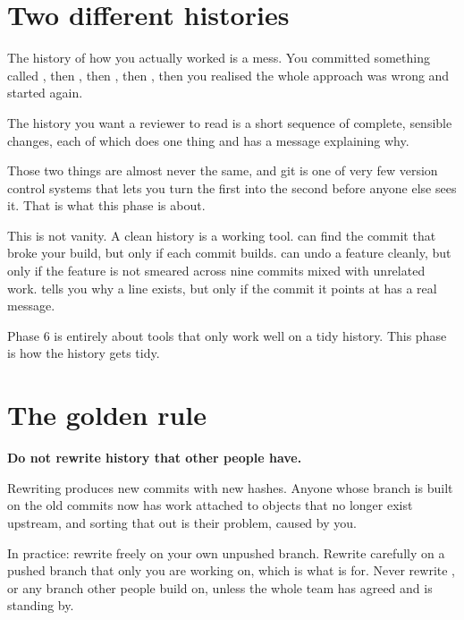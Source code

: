 \documentclass[11pt]{article}
\begin{document}
\maketitlepage

\section{Two different histories}

The history of how you actually worked is a mess. You committed something called
, then , then , then , then you
realised the whole approach was wrong and started again.

The history you want a reviewer to read is a short sequence of complete, sensible
changes, each of which does one thing and has a message explaining why.

Those two things are almost never the same, and git is one of very few version
control systems that lets you turn the first into the second before anyone else
sees it. That is what this phase is about.

\begin{why}
This is not vanity. A clean history is a working tool.  can find the
commit that broke your build, but only if each commit builds.  can
undo a feature cleanly, but only if the feature is not smeared across nine commits
mixed with unrelated work.  tells you why a line exists, but only if
the commit it points at has a real message.

Phase 6 is entirely about tools that only work well on a tidy history. This phase
is how the history gets tidy.
\end{why}

\section{The golden rule}

\begin{trap}
\textbf{Do not rewrite history that other people have.}

Rewriting produces new commits with new hashes. Anyone whose branch is built on the
old commits now has work attached to objects that no longer exist upstream, and
sorting that out is their problem, caused by you.

In practice: rewrite freely on your own unpushed branch. Rewrite carefully on a
pushed branch that only you are working on, which is what 
is for. Never rewrite , or any branch other people build on, unless the
whole team has agreed and is standing by.
\end{trap}
\end{document}
